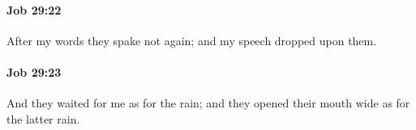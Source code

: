		\paragraph{Job 29:22} %
			\label{JOB-29-22}

			After my words they spake not again; and my speech dropped upon them.


		\paragraph{Job 29:23} %
			\label{JOB-29-23}

			And they waited for me as for the rain; and they opened their mouth wide as for the latter rain.


